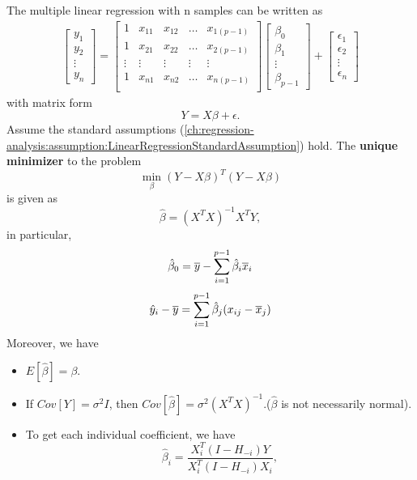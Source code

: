 \begin{refsection}
\begin{theorem}\label{ch:statistical-models:th:leastSquareSolution}\label{ch:statistical-models:th:OrdinaryLinearRegressionleastSquareSolution}
	The multiple linear regression with n samples can be written as
	\begin{align*}
	\begin{bmatrix}
	y_1\\
	y_2\\
	\vdots\\
	y_n
	\end{bmatrix} = \begin{bmatrix}
	1 & x_{11} & x_{12} & \dots & x_{1(p-1)}\\
	1 & x_{21} & x_{22} & \dots & x_{2(p-1)}\\
	\vdots & \vdots & \vdots & \vdots & \vdots \\
	1 & x_{n1} & x_{n2} & \dots & x_{n(p-1)}\\
	\end{bmatrix}
	\begin{bmatrix}
	\beta_0\\
	\beta_1\\
	\vdots\\
	\beta_{p-1}
	\end{bmatrix}
	+ \begin{bmatrix}
	\epsilon_1\\
	\epsilon_2\\
	\vdots\\
	\epsilon_{n}
	\end{bmatrix}
	\end{align*}
	with matrix form
	$$Y = X\beta + \epsilon.$$
Assume the standard assumptions (\autoref{ch:regression-analysis:assumption:LinearRegressionStandardAssumption}) hold.	
	The \textbf{unique minimizer} to the problem 
	$$\min_\beta (Y-X\beta)^T(Y - X\beta)$$
	is given as
	$$\hat{\beta} = (X^TX)^{-1}X^TY,$$
	in particular, $$\hat{\beta}_0 = \overline{y} - \sum_{i=1}^{p-1} \hat{\beta}_i \overline{x}_i$$
	$$\hat{y}_i - \overline{y} =\sum_{i=1}^{p-1} \hat{\beta}_j (x_{ij}-\overline{x}_j) $$
	Moreover, we have
	\begin{itemize}
		\item $E[\hat{\beta}] = \beta$.
		\item If $Cov[Y] = \sigma^2I$, then $Cov[\hat{\beta}] = \sigma^2(X^TX)^{-1}$.($\hat{\beta}$ is not necessarily normal).
		\item To get each individual coefficient, we have 
		$$\hat{\beta}_i = \frac{X_i^T(I - H_{-i})Y}{X_i^T(I-H_{-i})X_i},$$

\end{itemize}
\end{theorem}
\end{refsection}

